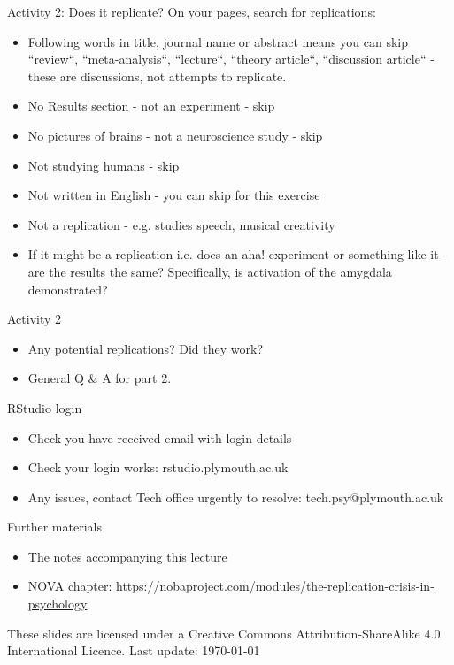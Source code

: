 \documentclass{beamer}
\begin{document}
\begin{frame}{Activity 2: Does it replicate?} 
  On your pages, search for replications:
  \begin{itemize}
  \item Following words in title, journal name or abstract means you can skip ``review``, ``meta-analysis``, ``lecture``, ``theory article``, ``discussion article`` - these are discussions, not attempts to replicate.
  \item No Results section - not an experiment - skip
  \item No pictures of brains - not a neuroscience study - skip
  \item Not studying humans - skip
  \item Not written in English - you can skip for this exercise
  \item Not a replication - e.g. studies speech, musical creativity
  \item If it might be a replication i.e. does an aha! experiment or something like it - are the results the same? Specifically, is activation of the amygdala demonstrated?
  \end{itemize}
\end{frame}

\begin{frame}{Activity 2}
  \begin{itemize}
  \item Any potential replications? Did they work?
  \item General Q \& A for part 2.
  \end{itemize}
\end{frame}

\begin{frame}{RStudio login}
  \begin{itemize}
    \item Check you have received email with login details
    \item Check your login works: rstudio.plymouth.ac.uk
    \item Any issues, contact Tech office urgently to resolve: tech.psy@plymouth.ac.uk
    \end{itemize}
\end{frame}

\begin{frame}{Further materials}
  \begin{itemize}
  \item The notes accompanying this lecture
  \item NOVA chapter: \url{ https://nobaproject.com/modules/the-replication-crisis-in-psychology}
  \end{itemize}
  \vspace{12pt}    
      \tiny
These slides are licensed under a Creative Commons Attribution-ShareAlike
4.0 International Licence. Last update: \today
    
\end{frame}
\end{document}
